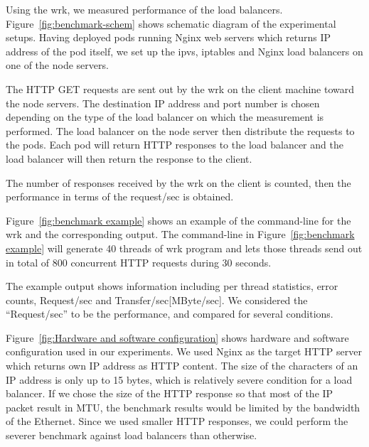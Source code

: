 Using the wrk, we measured performance of the load balancers.
Figure~\ref{fig:benchmark-schem} shows schematic diagram of the experimental setups.
Having deployed pods running Nginx web servers which returns IP address of the pod itself,
we set up the ipvs, iptables and Nginx load balancers on one of the node servers. 

The HTTP GET requests are sent out by the wrk on the client machine toward the node servers.
The destination IP address and port number is chosen 
depending on the type of the load balancer on which the measurement is performed.
The load balancer on the node server then distribute the requests to the pods.
Each pod will return HTTP responses to the load balancer and the load balancer will then return the response to the client.

The number of responses received by the wrk on the client is counted, 
then the performance in terms of the request/sec is obtained. 

Figure~\ref{fig:benchmark example} shows an example of the command-line for the wrk and the corresponding output.
The command-line in Figure~\ref{fig:benchmark example} will generate 40 threads of wrk program 
and lets those threads send out in total of 800 concurrent HTTP requests during 30 seconds.

The example output shows information including per thread statistics, error counts, Request/sec and Transfer/sec[MByte/sec].
We considered the \enquote{Request/sec} to be the performance, and compared for several conditions.

Figure~\ref{fig:Hardware and software configuration} shows hardware and software configuration used in our experiments.
We used Nginx as the target HTTP server which returns own IP address as HTTP content. 
The size of the characters of an IP address is only up to 15 bytes, 
which is relatively severe condition for a load balancer.
If we chose the size of the HTTP response so that most of the IP packet result in MTU,
the benchmark results would be limited by the bandwidth of the Ethernet.
Since we used smaller HTTP responses, we could perform the severer benchmark against load balancers than otherwise.

